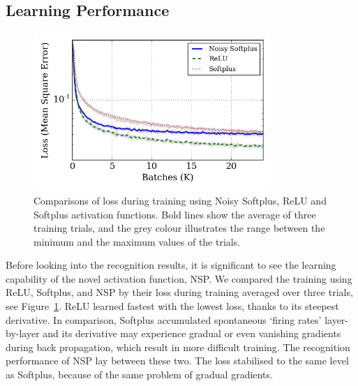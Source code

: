 	\subsection{Learning Performance}
	\label{subsec:result_compare}
	\begin{figure}[tbp!]
		\centering
		\includegraphics[width=0.8\textwidth]{pics_iconip/revise_8.png}
		\caption[Comparisons of loss during training.]{Comparisons of loss during training using Noisy Softplus, ReLU and Softplus activation functions. Bold lines show the average of three training trials, and the grey colour illustrates the range between the minimum and the maximum values of the trials.  }
		\label{Fig:loss_ns}
	\end{figure}
	Before looking into the recognition results, it is significant to see the learning capability of the novel activation function, NSP.
	We compared the training using ReLU, Softplus, and NSP by their loss during training averaged over three trials, see Figure~\ref{Fig:loss_ns}.
	ReLU learned fastest with the lowest loss, thanks to its steepest derivative.
	In comparison, Softplus accumulated spontaneous `firing rates' layer-by-layer and its derivative may experience gradual or even vanishing gradients during back propagation, which result in more difficult training.
	The recognition performance of NSP lay between these two.
	The loss stabilised to the same level as Softplus, because of the same problem of gradual gradients.
	
